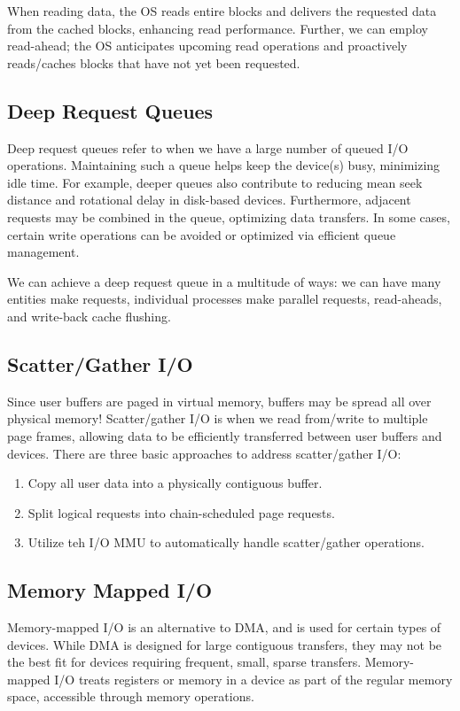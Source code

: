 \documentclass{report}
\begin{document}
When reading data, the OS reads entire blocks and delivers the requested data from the cached
blocks, enhancing read performance. Further, we can employ read-ahead; the OS anticipates upcoming
read operations and proactively reads/caches blocks that have not yet been requested.


\subsection{Deep Request Queues}
Deep request queues refer to when we have a large number of queued I/O operations. Maintaining such
a queue helps keep the device(s) busy, minimizing idle time. For example, deeper queues also contribute to
reducing mean seek distance and rotational delay in disk-based devices. Furthermore, adjacent requests may be
combined in the queue, optimizing data transfers. In some cases, certain write operations can be
avoided or optimized via efficient queue management.

We can achieve a deep request queue in a multitude of ways: we can have many entities make requests,
individual processes make parallel requests, read-aheads, and write-back cache flushing.


\subsection{Scatter/Gather I/O}
Since user buffers are paged in virtual memory, buffers may be spread all over physical memory!
Scatter/gather I/O is when we read from/write to multiple page frames, allowing data to be
efficiently transferred between user buffers and devices. There are three basic approaches to
address scatter/gather I/O:

\begin{enumerate}[label=\textit{(\roman*)}]
\item Copy all user data into a physically contiguous buffer.
\item Split logical requests into chain-scheduled page requests.
\item Utilize teh I/O MMU to automatically handle scatter/gather operations.
\end{enumerate}

\subsection{Memory Mapped I/O}
Memory-mapped I/O is an alternative to DMA, and is used for certain types of devices. While DMA is
designed for large contiguous transfers, they may not be the best fit for devices requiring
frequent, small, sparse transfers. Memory-mapped I/O treats registers or memory in a device as part
of the regular memory space, accessible through memory operations.
\end{document}

